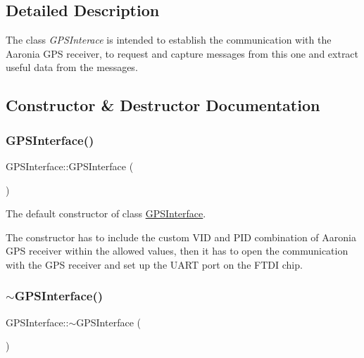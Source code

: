 \subsection{Detailed Description}
The class {\itshape G\+P\+S\+Interace} is intended to establish the communication with the Aaronia G\+PS receiver, to request and capture messages from this one and extract useful data from the messages. 

\subsection{Constructor \& Destructor Documentation}
\mbox{\label{classGPSInterface_a91c9f19d6588bcd34a8038bdc036c20c}} 
\subsubsection{\texorpdfstring{G\+P\+S\+Interface()}{GPSInterface()}}
{\footnotesize\ttfamily G\+P\+S\+Interface\+::\+G\+P\+S\+Interface (\begin{DoxyParamCaption}{ }\end{DoxyParamCaption})}



The default constructor of class \hyperlink{classGPSInterface}{G\+P\+S\+Interface}. 

The constructor has to include the custom V\+ID and P\+ID combination of Aaronia G\+PS receiver within the allowed values, then it has to open the communication with the G\+PS receiver and set up the U\+A\+RT port on the F\+T\+DI chip. \mbox{\label{classGPSInterface_ac8156be0348867ab39ba6e7909e16c3b}} 
\subsubsection{\texorpdfstring{$\sim$\+G\+P\+S\+Interface()}{~GPSInterface()}}
{\footnotesize\ttfamily G\+P\+S\+Interface\+::$\sim$\+G\+P\+S\+Interface (\begin{DoxyParamCaption}{ }\end{DoxyParamCaption})}



